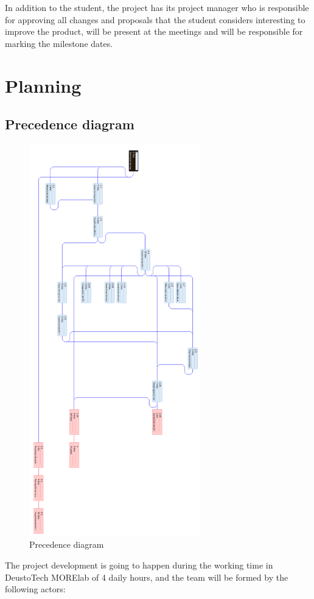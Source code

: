 \documentclass{DeustoFDP}
\begin{document}
In addition to the student, the project has its project manager who is responsible for approving all changes and proposals that the student considers interesting to improve the product, will be present at the meetings and will be responsible for marking the milestone dates.

\chapter{Planning}
\section{Precedence diagram}
\begin{figure}[H]
	\centering
	\includegraphics[width=210pt]{fig/precedencia}
	\caption{Precedence diagram}\label{fig:precedencediagram}
\end{figure}

The project development is going to happen during the working time in DeustoTech MORElab of 4 daily hours, and the team will be formed by the following actors:
\end{document}
